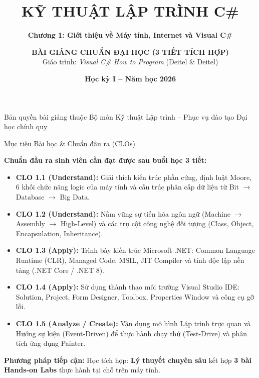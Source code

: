 \documentclass[aspectratio=169, 10pt]{beamer}
\title[\textbf{Lập trình C\# \& .NET -- Chương 1}]{\textbf{\LARGE KỸ THUẬT LẬP TRÌNH C\#}}
\subtitle{\textbf{\large Chương 1: Giới thiệu về Máy tính, Internet và Visual C\#}}
\author[\textbf{Khoa CNTT -- IT26M}]{\textbf{BÀI GIẢNG CHUẨN ĐẠI HỌC (3 TIẾT TÍCH HỢP)}\\Giáo trình: \textit{Visual C\# How to Program} (Deitel \& Deitel)}
\institute[\textbf{Lớp IT26M}]{\textbf{Khoa Công nghệ Thông tin -- Đại học Đông Á}\\\textbf{Đối tượng:} Lớp IT26M (Khóa 2026)}
\date[\textbf{2026}]{\textbf{Học kỳ I -- Năm học 2026}}
\begin{document}
\begin{frame}[plain]
  \titlepage
  \begin{center}
    \scriptsize \color{gray} Bản quyền bài giảng thuộc Bộ môn Kỹ thuật Lập trình -- Phục vụ đào tạo Đại học chính quy
  \end{center}
\end{frame}

\begin{frame}{Mục tiêu Bài học \& Chuẩn đầu ra (CLOs)}
  \begin{block}{\textbf{Chuẩn đầu ra sinh viên cần đạt được sau buổi học 3 tiết:}}
    \begin{itemize}
      \item \textbf{CLO 1.1 (Understand):} Giải thích kiến trúc phần cứng, định luật Moore, 6 khối chức năng logic của máy tính và cấu trúc phân cấp dữ liệu từ Bit $\to$ Database $\to$ Big Data.
      \item \textbf{CLO 1.2 (Understand):} Nắm vững sự tiến hóa ngôn ngữ (Machine $\to$ Assembly $\to$ High-Level) và các trụ cột công nghệ đối tượng (Class, Object, Encapsulation, Inheritance).
      \item \textbf{CLO 1.3 (Apply):} Trình bày kiến trúc Microsoft .NET: Common Language Runtime (CLR), Managed Code, MSIL, JIT Compiler và tính độc lập nền tảng (.NET Core / .NET 8).
      \item \textbf{CLO 1.4 (Apply):} Sử dụng thành thạo môi trường Visual Studio IDE: Solution, Project, Form Designer, Toolbox, Properties Window và công cụ gỡ lỗi.
      \item \textbf{CLO 1.5 (Analyze / Create):} Vận dụng mô hình Lập trình trực quan và Hướng sự kiện (Event-Driven) để thực hành chạy thử (Test-Drive) và phân tích ứng dụng Painter.
    \end{itemize}
  \end{block}
  \vspace{-2mm}
  \begin{exampleblock}{\textbf{Phương pháp tiếp cận:}}
    Học tích hợp: \textbf{Lý thuyết chuyên sâu} kết hợp \textbf{3 bài Hands-on Labs} thực hành tại chỗ trên máy tính.
  \end{exampleblock}
\end{frame}
\end{document}
